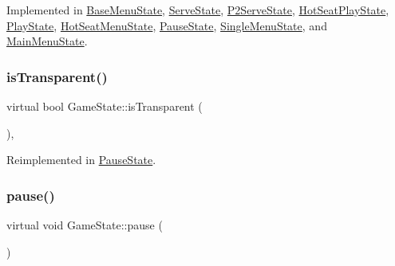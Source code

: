 Implemented in \mbox{\hyperlink{class_base_menu_state_ae29d522c56a4582ce79e113426421741}{Base\+Menu\+State}}, \mbox{\hyperlink{class_serve_state_ab39cdbf8c6fe8bbcf67d29033c3e2c15}{Serve\+State}}, \mbox{\hyperlink{class_p2_serve_state_a7f6cbb73e0d08949e3df08b97ba089f5}{P2\+Serve\+State}}, \mbox{\hyperlink{class_hot_seat_play_state_a2d1a6b35aac53c988e7b036d89794e70}{Hot\+Seat\+Play\+State}}, \mbox{\hyperlink{class_play_state_ae5761f09579d0f1800253764f2d68218}{Play\+State}}, \mbox{\hyperlink{class_hot_seat_menu_state_a29beb4656c180d0cfc3b8ca20ae2d172}{Hot\+Seat\+Menu\+State}}, \mbox{\hyperlink{class_pause_state_a1e3378e3a16fc37c87c12f854d86005b}{Pause\+State}}, \mbox{\hyperlink{class_single_menu_state_a9494d848c97fe4d406f122f3d97bc38d}{Single\+Menu\+State}}, and \mbox{\hyperlink{class_main_menu_state_a83efff7f63145d55d1937e76970d2a25}{Main\+Menu\+State}}.

\mbox{\label{class_game_state_af75d6db30190901ed70704d18804fac7}} 
\subsubsection{\texorpdfstring{isTransparent()}{isTransparent()}}
{\footnotesize\ttfamily virtual bool Game\+State\+::is\+Transparent (\begin{DoxyParamCaption}{ }\end{DoxyParamCaption})\hspace{0.3cm}{\ttfamily [inline]}, {\ttfamily [virtual]}}



Reimplemented in \mbox{\hyperlink{class_pause_state_a1d8e1f454ead5881c3ad396798eb4ac1}{Pause\+State}}.

\mbox{\label{class_game_state_aafc908582760099891b37bb380ddd87a}} 
\subsubsection{\texorpdfstring{pause()}{pause()}}
{\footnotesize\ttfamily virtual void Game\+State\+::pause (\begin{DoxyParamCaption}{ }\end{DoxyParamCaption})\hspace{0.3cm}{\ttfamily [pure virtual]}}




